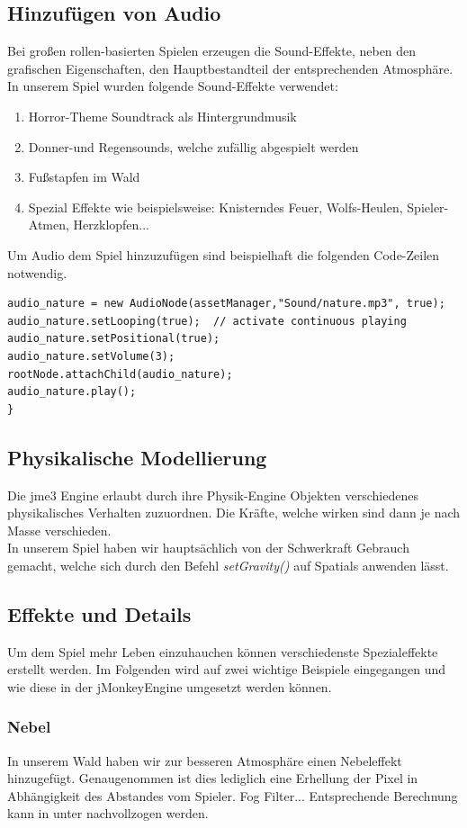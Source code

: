 \subsection{Hinzufügen von Audio}
Bei großen rollen-basierten Spielen erzeugen die Sound-Effekte, neben den grafischen Eigenschaften, den Hauptbestandteil der entsprechenden Atmosphäre. In unserem Spiel wurden folgende Sound-Effekte verwendet:
\begin{enumerate}
	\item Horror-Theme Soundtrack als Hintergrundmusik
	\item Donner-und Regensounds, welche zufällig abgespielt werden
	\item Fußstapfen im Wald
	\item Spezial Effekte wie beispielsweise: Knisterndes Feuer, Wolfs-Heulen, Spieler-Atmen, Herzklopfen...
\end{enumerate} Um Audio dem Spiel hinzuzufügen sind beispielhaft die folgenden Code-Zeilen notwendig.

\begin{lstlisting}
audio_nature = new AudioNode(assetManager,"Sound/nature.mp3", true);
audio_nature.setLooping(true);  // activate continuous playing
audio_nature.setPositional(true);   
audio_nature.setVolume(3);
rootNode.attachChild(audio_nature);
audio_nature.play();
}
\end{lstlisting}


\subsection{Physikalische Modellierung}
Die jme3 Engine erlaubt durch ihre Physik-Engine Objekten verschiedenes physikalisches Verhalten zuzuordnen. Die Kräfte, welche wirken sind dann je nach Masse verschieden.\\
In unserem Spiel haben wir hauptsächlich von der Schwerkraft Gebrauch gemacht, welche sich durch den Befehl\emph{ setGravity()} auf Spatials anwenden lässt.

\subsection{Effekte und Details}
Um dem Spiel mehr Leben einzuhauchen können verschiedenste Spezialeffekte erstellt werden. Im Folgenden wird auf zwei wichtige Beispiele eingegangen und wie diese in der jMonkeyEngine umgesetzt werden können.
\subsubsection{Nebel}
In unserem Wald haben wir zur besseren Atmosphäre einen Nebeleffekt hinzugefügt. Genaugenommen ist dies lediglich eine Erhellung der Pixel in Abhängigkeit des Abstandes vom Spieler. 
Fog Filter... Entsprechende Berechnung kann in unter \cite{Cr14} nachvollzogen werden.

